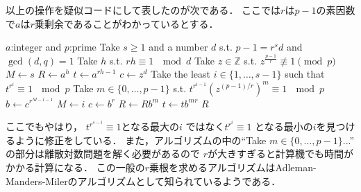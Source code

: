 \documentclass[leqno]{jsarticle}
\newcommand{\zz}{\mathbb{Z}}
\begin{document}
以上の操作を疑似コードにして表したのが次である．
ここでは$r$は$p-1$の素因数で$a$は$r$乗剰余であることがわかっているとする．
\begin{algorithm}
\caption{Solving $x^r\equiv a\ \mod p$}
\begin{algorithmic}
\REQUIRE $a$:integer and $p$:prime 
\STATE Take $s\ge 1$ and a number $d$ 
s.t.  $p-1=r^sd$ and $\gcd(d, q)=1$ 
\STATE Take $h$ s.t. $rh\equiv 1\ \mod d$
\STATE Take  $z\in \zz$ s.t. $z^{\frac{p-1}{r}}\not\equiv 1\pmod{p}$
\STATE $M\gets s$
\STATE $R\gets a^{h}$
\STATE $t\gets a^{rh-1}$
\STATE $c\gets z^d$
\STATE Take the least $i\in \{1, \dots, s-1\}$ such that 
$t^{r^{i}}\equiv 1\ \mod p$
\STATE Take $m\in \{0, \dots, p-1\}$
s.t. $t^{r^{i-1}}\left(z^{(p-1)/r}\right)^{m}\equiv 1\ \mod p$
\STATE $b\gets c^{r^{M-i-1}}$ 
\STATE $M\gets i$
\STATE $c\gets b^r$
\STATE $R\leftarrow Rb^m$
\STATE  $t\leftarrow tb^{mr}$
\ENDWHILE
\RETURN $R$
\end{algorithmic}
\end{algorithm}

ここでもやはり，
$t^{r^{s-i}}\equiv 1$となる最大の$i$
ではなく$t^{r^i}\equiv 1$
となる最小の$i$を見つけるように修正をしている．
また，アルゴリズムの中の``Take $m\in \{0, \dots, p-1\}$...''
の部分は離散対数問題を解く必要があるので
$r$が大きすぎると計算機でも時間がかかる計算になる．
この一般の$r$乗根を求めるアルゴリズムはAdleman-Manders-Milerのアルゴリズムとして知られているようである．
\end{document}
